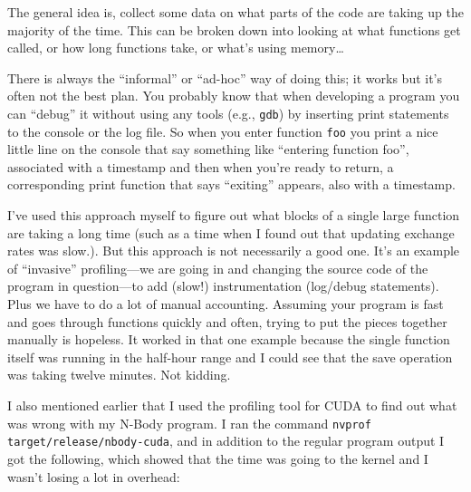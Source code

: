 \documentclass[a4paper]{report}
\begin{document}
The general idea is, collect some data on what parts of the code are taking up the majority of the time. This can be broken down into looking at what functions get called, or how long functions take, or what's using memory\ldots

There is always the ``informal'' or ``ad-hoc'' way of doing this; it works but it's often not the best plan. You probably know that when developing a program you can ``debug'' it without using any tools (e.g., \texttt{gdb}) by inserting print statements to the console or the log file. So when you enter function \texttt{foo} you print a nice little line on the console that say something like ``entering function foo'', associated with a timestamp and then when you're ready to return, a corresponding print function that says ``exiting'' appears, also with a timestamp.

I've used this approach myself to figure out what blocks of a single large function are taking a long time (such as a time when I found out that updating exchange rates was slow.). But this approach is not necessarily a good one.  It's an example of ``invasive'' profiling---we are going in and changing the source code of the program in question---to add (slow!) instrumentation (log/debug statements). Plus we have to do a lot of manual accounting. Assuming your program is fast and goes through functions quickly and often, trying to put the pieces together manually is hopeless. It worked in that one example because the single function itself was running in the half-hour range and I could see that the save operation was taking twelve minutes. Not kidding.

I also mentioned earlier that I used the profiling tool for CUDA to find out what was wrong with my N-Body program. I ran the command \texttt{nvprof target/release/nbody-cuda}, and in addition to the regular program output I got the following, which showed that the time was going to the kernel and I wasn't losing a lot in overhead:
\end{document}
